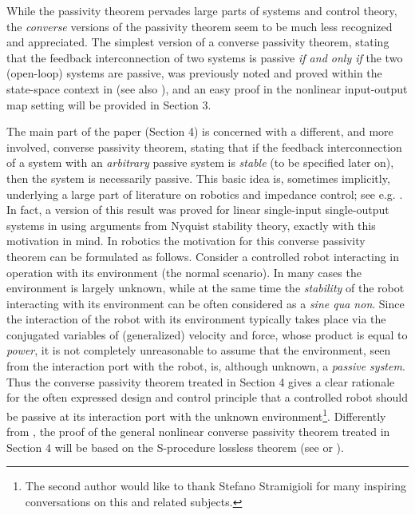 \documentclass{ifacconf}
\theoremstyle{definition}
\begin{document}
While the passivity theorem pervades large parts of systems and control theory, the {\it converse} versions of the passivity theorem seem to be much
less recognized and appreciated. The simplest version of a converse passivity theorem, stating that the feedback interconnection of two systems is
passive {\it if and only if} the two (open-loop) systems are passive, was previously noted and proved within the state-space context in \cite{kerber-vds11}
(see also \cite{Sch16}), and an easy proof in the nonlinear input-output map setting will be provided in Section 3.

The main part of the paper (Section 4) is concerned with a different, and more involved, converse passivity theorem, stating that if the feedback
interconnection of a system with an {\it arbitrary} passive system is {\it stable} (to be specified later on), then the system is necessarily
passive. This basic idea is, sometimes implicitly, underlying a large part of literature on robotics and impedance control; see
e.g. \cite{Str15}. In fact, a version of this result was proved for linear single-input single-output systems in \cite{colgate-hogan} using arguments from
Nyquist stability theory, exactly with this motivation in mind. In robotics the motivation for this converse passivity theorem can be formulated as
follows. Consider a controlled robot interacting in operation with its environment (the normal scenario). In many cases the environment is largely
unknown, while at the same time the {\it stability} of the robot interacting with its environment can be often considered as a {\it sine qua
  non}. Since the interaction of the robot with its environment typically takes place via the conjugated variables of (generalized) velocity and
force, whose product is equal to {\it power}, it is not completely unreasonable to assume that the environment, seen from the interaction port with
the robot, is, although unknown, a {\it passive system}. Thus the converse passivity theorem treated in Section 4 gives a clear rationale for the
often expressed design and control principle \citep{Str15, colgate-hogan} that a controlled robot should be passive at its interaction port with the
unknown environment\footnote{The second author would like to thank Stefano Stramigioli for many inspiring conversations on this and related
  subjects.}. Differently from \cite{colgate-hogan, Str15}, the proof of the general nonlinear converse passivity theorem treated in Section 4 will be based on
the S-procedure lossless theorem (see \cite{MegTre93} or \cite[Thm. 7]{Jon01}). %
\end{document}
